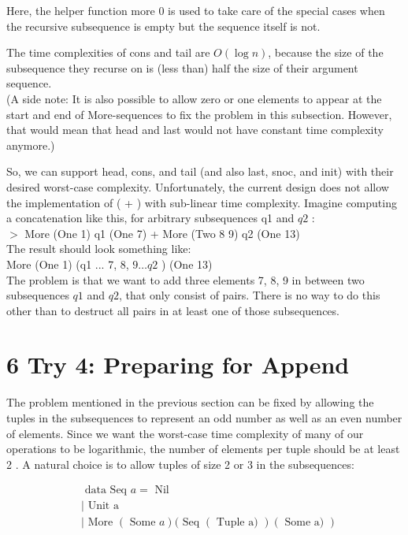 \documentclass[10pt]{article}
\begin{document}
Here, the helper function more 0 is used to take care of the special cases when the recursive subsequence is empty but the sequence itself is not.

The time complexities of cons and tail are $O(\log n)$, because the size of the subsequence they recurse on is (less than) half the size of their argument sequence.\\
(A side note: It is also possible to allow zero or one elements to appear at the start and end of More-sequences to fix the problem in this subsection. However, that would mean that head and last would not have constant time complexity anymore.)

So, we can support head, cons, and tail (and also last, snoc, and init) with their desired worst-case complexity. Unfortunately, the current design does not allow the implementation of ( + ) with sub-linear time complexity. Imagine computing a concatenation like this, for arbitrary subsequences q1 and $q 2$ :\\
$>$ More (One 1) q1 (One 7) + More (Two 8 9) q2 (One 13)\\
The result should look something like:\\
More (One 1) (q1 ... 7, 8, $9 \ldots q 2$ ) (One 13)\\
The problem is that we want to add three elements 7, 8, 9 in between two subsequences $q 1$ and $q 2$, that only consist of pairs. There is no way to do this other than to destruct all pairs in at least one of those subsequences.

\section*{6 Try 4: Preparing for Append}
The problem mentioned in the previous section can be fixed by allowing the tuples in the subsequences to represent an odd number as well as an even number of elements. Since we want the worst-case time complexity of many of our operations to be logarithmic, the number of elements per tuple should be at least 2 . A natural choice is to allow tuples of size 2 or 3 in the subsequences:

$$
\begin{aligned}
& \text { data Seq } a=\text { Nil } \\
& \mid \text { Unit a } \\
& \mid \text { More }(\text { Some } a)(\text { Seq }(\text { Tuple a) })(\text { Some a) })
\end{aligned}
$$
\end{document}
